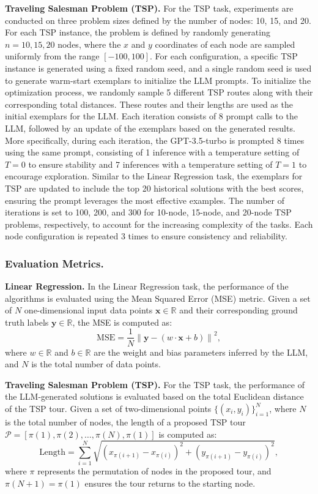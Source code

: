 \textbf{Traveling Salesman Problem (TSP).} For the TSP task, experiments are conducted on three problem sizes defined by the number of nodes: 10, 15, and 20. 
For each TSP instance, the problem is defined by randomly generating $n=10,15,20$ nodes, where the $x$ and $y$ coordinates of each node are sampled uniformly from the range $[-100, 100]$.
For each configuration, a specific TSP instance is generated using a fixed random seed, and a single random seed is used to generate warm-start exemplars to initialize the LLM prompts. 
To initialize the optimization process, we randomly sample 5 different TSP routes along with their corresponding total distances. These routes and their lengths are used as the initial exemplars for the LLM.
Each iteration consists of 8 prompt calls to the LLM, followed by an update of the exemplars based on the generated results. 
More specifically, during each iteration, the GPT-3.5-turbo is prompted 8 times using the same prompt, consisting of 1 inference with a temperature setting of $T=0$ to ensure stability and 7 inferences with a temperature setting of $T=1$ to encourage exploration. 
Similar to the Linear Regression task, the exemplars for TSP are updated to include the top 20 historical solutions with the best scores, ensuring the prompt leverages the most effective examples. The number of iterations is set to 100, 200, and 300 for 10-node, 15-node, and 20-node TSP problems, respectively, to account for the increasing complexity of the tasks. Each node configuration is repeated 3 times to ensure consistency and reliability.

\subsubsection{Evaluation Metrics.}
\textbf{Linear Regression.}
In the Linear Regression task, the performance of the algorithms is evaluated using the Mean Squared Error (MSE) metric. Given a set of $N$ one-dimensional input data points \(\mathbf{x} \in \mathbb{R}\) and their corresponding ground truth labels \(\mathbf{y} \in \mathbb{R}\), the MSE is computed as:
\[
\text{MSE} = \frac{1}{N} \left\lVert \mathbf{y} - (w \cdot \mathbf{x} + b) \right\rVert^2,
\]
where \(w \in \mathbb{R}\) and \(b \in \mathbb{R}\) are the weight and bias parameters inferred by the LLM, and \(N\) is the total number of data points.

\textbf{Traveling Salesman Problem (TSP).}
For the TSP task, the performance of the LLM-generated solutions is evaluated based on the total Euclidean distance of the TSP tour. Given a set of two-dimensional points \(\{(x_i, y_i)\}_{i=1}^N\), where \(N\) is the total number of nodes, the length of a proposed TSP tour \(\mathcal{P} = [\pi(1), \pi(2), \dots, \pi(N), \pi(1)]\) is computed as:
\[
\text{Length} = \sum_{i=1}^{N} \sqrt{\left( x_{\pi(i+1)} - x_{\pi(i)} \right)^2 + \left( y_{\pi(i+1)} - y_{\pi(i)} \right)^2},
\]
where \(\pi\) represents the permutation of nodes in the proposed tour, and \(\pi(N+1) = \pi(1)\) ensures the tour returns to the starting node.

